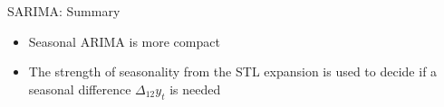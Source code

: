 \begin{frame}{SARIMA: Summary}
	
	\begin{itemize}[<+->]
		\item Seasonal ARIMA is more compact
		\item The strength of seasonality from the \alert{STL} expansion is used to decide if a seasonal difference $\Delta_{12} y_t$ is needed

	\end{itemize}
\end{frame}

